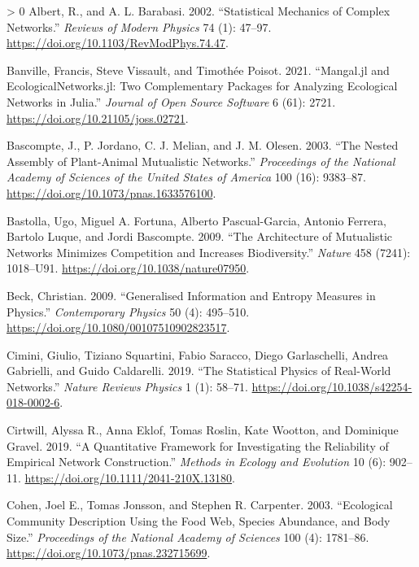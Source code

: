 \documentclass[11pt]{article}
\newlength{\cslhangindent}
\newenvironment{CSLReferences}[3] %
 {%
  \setlength{\parindent}{0pt}
  \ifodd #1 \everypar{\setlength{\hangindent}{\cslhangindent}}\ignorespaces\fi
  \ifnum #2 > 0
  \setlength{\parskip}{#2\baselineskip}
  \fi
 }%
 {}
\begin{document}
\hypertarget{refs}{}
\begin{CSLReferences}{1}{0}
\leavevmode\hypertarget{ref-Albert2002StaMec}{}%
Albert, R., and A. L. Barabasi. 2002. {``Statistical Mechanics of
Complex Networks.''} \emph{Reviews of Modern Physics} 74 (1): 47--97.
\url{https://doi.org/10.1103/RevModPhys.74.47}.

\leavevmode\hypertarget{ref-Banville2021ManJla}{}%
Banville, Francis, Steve Vissault, and Timothée Poisot. 2021.
{``Mangal.jl and EcologicalNetworks.jl: Two Complementary Packages for
Analyzing Ecological Networks in Julia.''} \emph{Journal of Open Source
Software} 6 (61): 2721. \url{https://doi.org/10.21105/joss.02721}.

\leavevmode\hypertarget{ref-Bascompte2003NesAssa}{}%
Bascompte, J., P. Jordano, C. J. Melian, and J. M. Olesen. 2003. {``The
Nested Assembly of Plant-Animal Mutualistic Networks.''}
\emph{Proceedings of the National Academy of Sciences of the United
States of America} 100 (16): 9383--87.
\url{https://doi.org/10.1073/pnas.1633576100}.

\leavevmode\hypertarget{ref-Bastolla2009ArcMut}{}%
Bastolla, Ugo, Miguel A. Fortuna, Alberto Pascual-Garcia, Antonio
Ferrera, Bartolo Luque, and Jordi Bascompte. 2009. {``The Architecture
of Mutualistic Networks Minimizes Competition and Increases
Biodiversity.''} \emph{Nature} 458 (7241): 1018--U91.
\url{https://doi.org/10.1038/nature07950}.

\leavevmode\hypertarget{ref-Beck2009GenInf}{}%
Beck, Christian. 2009. {``Generalised Information and Entropy Measures
in Physics.''} \emph{Contemporary Physics} 50 (4): 495--510.
\url{https://doi.org/10.1080/00107510902823517}.

\leavevmode\hypertarget{ref-Cimini2019StaPhy}{}%
Cimini, Giulio, Tiziano Squartini, Fabio Saracco, Diego Garlaschelli,
Andrea Gabrielli, and Guido Caldarelli. 2019. {``The Statistical Physics
of Real-World Networks.''} \emph{Nature Reviews Physics} 1 (1): 58--71.
\url{https://doi.org/10.1038/s42254-018-0002-6}.

\leavevmode\hypertarget{ref-Cirtwill2019QuaFrac}{}%
Cirtwill, Alyssa R., Anna Eklof, Tomas Roslin, Kate Wootton, and
Dominique Gravel. 2019. {``A Quantitative Framework for Investigating
the Reliability of Empirical Network Construction.''} \emph{Methods in
Ecology and Evolution} 10 (6): 902--11.
\url{https://doi.org/10.1111/2041-210X.13180}.

\leavevmode\hypertarget{ref-Cohen2003EcoComa}{}%
Cohen, Joel E., Tomas Jonsson, and Stephen R. Carpenter. 2003.
{``Ecological Community Description Using the Food Web, Species
Abundance, and Body Size.''} \emph{Proceedings of the National Academy
of Sciences} 100 (4): 1781--86.
\url{https://doi.org/10.1073/pnas.232715699}.


\end{CSLReferences}
\end{document}
